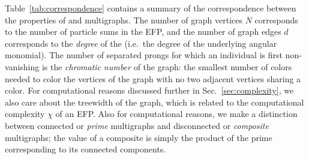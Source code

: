 \documentclass[letterpaper,11pt]{article}
\DeclareRobustCommand{\Sec}[1]{Sec.~\ref{#1}}
\DeclareRobustCommand{\Tab}[1]{Table~\ref{#1}}
\newcommand{\B}{\text{EFP}\xspace}
\newcommand{\Bs}{\text{EFPs}\xspace}
\begin{document}
\Tab{tab:correspondence} contains a summary of the correspondence between the properties of \Bs and multigraphs.
%
The number of graph vertices $N$ corresponds to the number of particle sums in the EFP, and the number of graph edges $d$ corresponds to the \emph{degree} of the \B (i.e.\ the degree of the underlying angular monomial).
%
The number of separated prongs for which an individual \B is first non-vanishing is the \emph{chromatic number} of the graph: the smallest number of colors needed to color the vertices of the graph with no two adjacent vertices sharing a color.
%
For computational reasons discussed further in \Sec{sec:complexity}, we also care about the treewidth of the graph, which is related to the computational complexity $\chi$ of an EFP.
%
Also for computational reasons, we make a distinction between connected or \emph{prime} multigraphs and disconnected or \emph{composite} multigraphs; the value of a composite \B is simply the product of the prime \Bs corresponding to its connected components.
\end{document}
